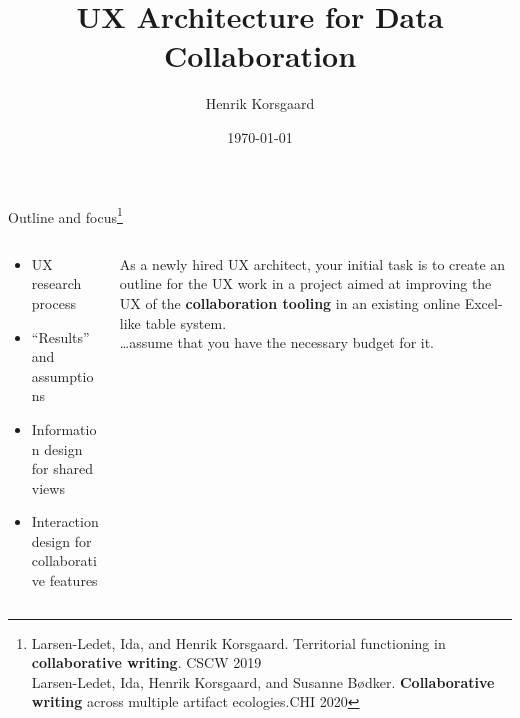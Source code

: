 \documentclass[aspectratio=169]{beamer}
\title[Stiby Systems Case Presentation]{UX Architecture for Data Collaboration}
\date[]{\today}
\author[]{Henrik Korsgaard}
\institute{DEPARTMENT OF COMPUTER SCIENCE} %
\begin{document}
\begin{frame}
\maketitle
\end{frame}

\begin{frame}{Outline and focus\footnote{Larsen-Ledet, Ida, and Henrik Korsgaard. Territorial functioning in \textbf{collaborative writing}. CSCW 2019\\Larsen-Ledet, Ida, Henrik Korsgaard, and Susanne Bødker. \textbf{Collaborative writing} across multiple artifact ecologies.CHI 2020}}
    \begin{columns}
        \begin{column}{0.5\textwidth}
            \begin{itemize}
                \item UX research process
                \item ``Results'' and assumptions
                \item Information design for shared views
                \item Interaction design for collaborative features
            \end{itemize}
        \end{column}
        \begin{column}{0.5\textwidth}
            As a newly hired UX architect, your initial task is to create an outline for the UX work in a project aimed at improving the UX of the \textbf{collaboration tooling} in an existing online Excel-like table system.\\
            \vspace{1em}
            {\color{HenrikFontLight}\dots assume that you have the necessary budget for it.}
        \end{column}
    \end{columns}
\end{frame}
\end{document}
